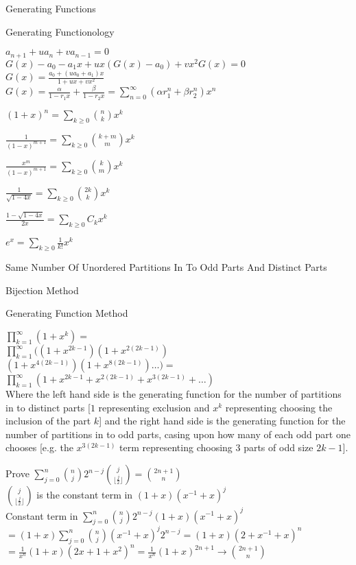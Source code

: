 Generating Functions

Generating Functionology

$a_{n+1}+ua_n+va_{n-1}=0$ \\
$G(x)-a_0-a_1 x+ux(G(x)-a_0)+vx^2G(x)=0$ \\
$G(x)=\frac{a_0+(ua_0+a_1)x}{1+ux+vx^2}$ \\
$G(x)=\frac{\alpha}{1-r_1 x}+\frac{\beta}{1-r_2 x}=\sum_{n=0}^{\infty} (\alpha r_1^n + \beta r_2^n)x^n$

$(1+x)^n = \sum_{k \ge 0} \binom{n}{k} x^k$

$\frac{1}{(1-x)^{m+1}} = \sum_{k \ge 0} \binom{k+m}{m} x^k$

$\frac{x^m}{(1-x)^{m+1}} = \sum_{k \ge 0} \binom{k}{m} x^k$

$\frac{1}{\sqrt{1-4x}} = \sum_{k \ge 0} \binom{2k}{k} x^k$

$\frac{1-\sqrt{1-4x}}{2x} = \sum_{k \ge 0} C_k x^k$

$e^x = \sum_{k \ge 0} \frac{1}{k!} x^k$

Same Number Of Unordered Partitions In To Odd Parts And Distinct Parts

Bijection Method

Generating Function Method

$\prod_{k=1}^{\infty} (1+x^k)=$ \\
$\prod_{k=1}^{\infty} ((1+x^{2k-1})(1+x^{2(2k-1)})$ \\
$(1+x^{4(2k-1)})(1+x^{8(2k-1)})\dots)=$ \\
$\prod_{k=1}^{\infty} (1+x^{2k-1}+x^{2(2k-1)}+x^{3(2k-1)}+\dots)$ \\
Where the left hand side is the generating function for the number of partitions in to distinct parts [$1$ representing exclusion and $x^k$ representing choosing the inclusion of the part $k$] and the right hand side is the generating function for the number of partitions in to odd parts, casing upon how many of each odd part one chooses [e.g. the $x^{3(2k-1)}$ term representing choosing $3$ parts of odd size $2k-1$].

Prove $\sum_{j=0}^n \binom{n}{j}2^{n-j}\binom{j}{\lfloor \frac{j}{2} \rfloor} = \binom{2n+1}{n}$ \\
$\binom{j}{\lfloor \frac{j}{2} \rfloor}$ is the constant term in $(1+x)(x^{-1}+x)^j$ \\
Constant term in $\sum_{j=0}^n \binom{n}{j}2^{n-j}(1+x)(x^{-1}+x)^j$ \\
$= (1+x)\sum_{j=0}^n \binom{n}{j}(x^{-1}+x)^j 2^{n-j} = (1+x)(2+x^{-1}+x)^n$ \\
$= \frac{1}{x^n} (1+x)(2x+1+x^2)^n = \frac{1}{x^n} (1+x)^{2n+1} \to \binom{2n+1}{n}$

